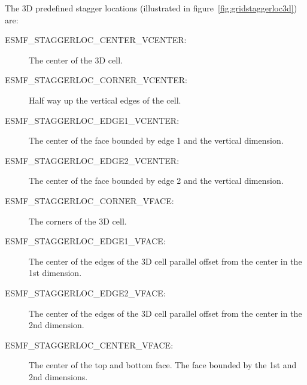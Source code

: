 The 3D predefined stagger locations (illustrated in figure~\ref{fig:gridstaggerloc3d}) are:\\
\begin{description}
\item [ESMF\_STAGGERLOC\_CENTER\_VCENTER:] The center of the 3D cell.
\item [ESMF\_STAGGERLOC\_CORNER\_VCENTER:] Half way up the vertical edges of the cell.
\item [ESMF\_STAGGERLOC\_EDGE1\_VCENTER:] The center of the face bounded by edge 1 and the vertical dimension.
\item [ESMF\_STAGGERLOC\_EDGE2\_VCENTER:] The center of the face bounded by edge 2 and the vertical dimension. 
\item [ESMF\_STAGGERLOC\_CORNER\_VFACE:] The corners of the 3D cell.
\item [ESMF\_STAGGERLOC\_EDGE1\_VFACE:] The center of the edges of the 3D cell parallel offset from the center in the 1st dimension.
\item [ESMF\_STAGGERLOC\_EDGE2\_VFACE:] The center of the edges of the 3D cell parallel offset from the center in the 2nd dimension.
\item [ESMF\_STAGGERLOC\_CENTER\_VFACE:] The center of the top and bottom face. The face bounded by the 1st and 2nd dimensions. 
\end{description}

